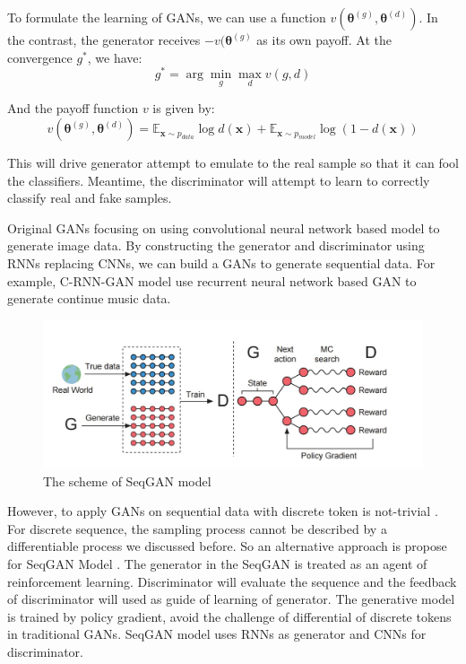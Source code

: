 To formulate the learning of GANs, we can use a function $ v(\bm{\theta}^{(g)}, \bm{\theta}^{(d)}) $. In the contrast, the generator receives $ -v(\bm{\theta}^{(g)} $ as its own payoff. At the convergence $ g^* $, we have:
\[ g^* = \arg \min_{g} \max_{d}v(g, d) \]

And the payoff function $ v $ is given by:
\[ v(\bm{\theta}^{(g)}, \bm{\theta}^{(d)}) = \mathbb{E}_{\mathbf{x}\sim p_{\textit{data}}}\log d(\bm{x})+ \mathbb{E}_{\mathbf{x}\sim p_{\textit{model}}}\log (1- d(\bm{x}))\]

This will drive generator attempt to emulate to the real sample so that it can fool the classifiers. Meantime, the discriminator will attempt to learn to correctly classify real and fake samples.

Original GANs focusing on using convolutional neural network based model to generate image data. By constructing the generator and discriminator using RNNs replacing CNNs, we can build a GANs to generate sequential data. For example, C-RNN-GAN model \cite{mogren2016crnngan} use recurrent neural network based GAN to generate continue music data. 

\begin{figure}[htbp]
	\centering
	\includegraphics[width=0.9\linewidth]{SwqGAN.jpg}
	\caption{The scheme of SeqGAN model}
	\label{fig:seqGAN}
\end{figure}

However, to apply GANs on sequential data with discrete token is not-trivial \cite{huszar2015}. For discrete sequence, the sampling process cannot be described by a differentiable process we discussed before. So an alternative approach is propose for SeqGAN Model \cite{yu2016seqgan}. The generator in the SeqGAN is treated as an agent of reinforcement learning. Discriminator will evaluate the sequence and the feedback of discriminator will used as guide of learning of generator. The generative model is trained by policy gradient, avoid the challenge of differential of discrete tokens in traditional GANs. SeqGAN model uses RNNs as generator and CNNs for discriminator.
